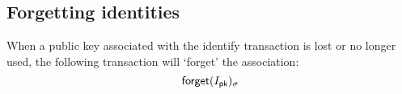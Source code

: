 \subsection{Forgetting identities}
When a public key associated with the \textsf{identify} transaction is lost or no
longer used, the following transaction will `forget' the association:
\[
    \operatorname{\mathsf{forget}}\lparen I_{\mathsf{pk}}\rparen_\sigma
\]

